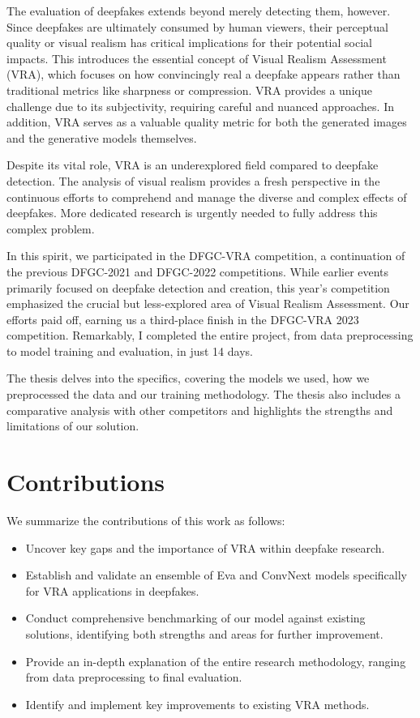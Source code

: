 \documentclass[a4paper,12pt,openright]{book}
\begin{document}
The evaluation of deepfakes extends beyond merely detecting them, however. Since deepfakes are ultimately consumed by human viewers, their perceptual quality or visual realism has critical implications for their potential social impacts. This introduces the essential concept of Visual Realism Assessment (VRA), which focuses on how convincingly real a deepfake appears rather than traditional metrics like sharpness or compression. VRA provides a unique challenge due to its subjectivity, requiring careful and nuanced approaches. In addition, VRA serves as a valuable quality metric for both the generated images and the generative models themselves.

Despite its vital role, VRA is an underexplored field compared to deepfake detection. The analysis of visual realism provides a fresh perspective in the continuous efforts to comprehend and manage the diverse and complex effects of deepfakes. More dedicated research is urgently needed to fully address this complex problem.

In this spirit, we participated in the DFGC-VRA competition, a continuation of the previous DFGC-2021 and DFGC-2022 competitions. While earlier events primarily focused on deepfake detection and creation, this year's competition emphasized the crucial but less-explored area of Visual Realism Assessment. Our efforts paid off, earning us a third-place finish in the DFGC-VRA 2023 competition.  Remarkably, I completed the entire project, from data preprocessing to model training and evaluation, in just 14 days.

The thesis delves into the specifics, covering the models we used, how we preprocessed the data and our training methodology. The thesis also includes a comparative analysis with other competitors and highlights the strengths and limitations of our solution.

\section{Contributions}

We summarize the contributions of this work as follows:

\begin{itemize}
    \item Uncover key gaps and the importance of VRA within deepfake research.
    \item Establish and validate an ensemble of Eva and ConvNext models specifically for VRA applications in deepfakes.
    \item Conduct comprehensive benchmarking of our model against existing solutions, identifying both strengths and areas for further improvement.
    \item Provide an in-depth explanation of the entire research methodology, ranging from data preprocessing to final evaluation.
    \item Identify and implement key improvements to existing VRA methods.
\end{itemize}
\end{document}
